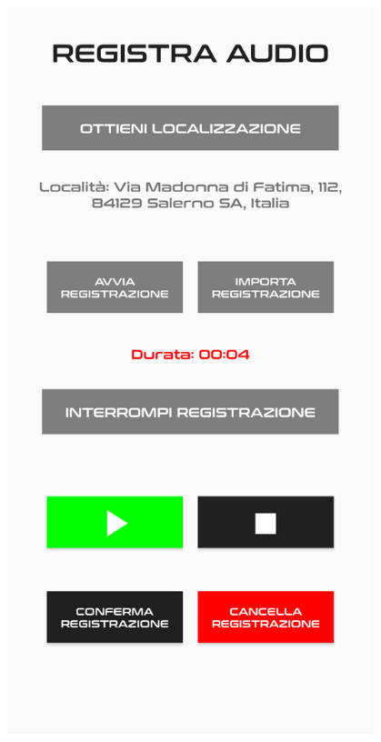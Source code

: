 \documentclass{article}
\begin{document}
\begin{minipage}[t]{0.35\textwidth}
    \centering
    \vspace*{10pt}
    \includegraphics[width=0.8\textwidth]{registrazioneaudio.png}\vspace*{40pt}
\end{minipage}
\end{document}
